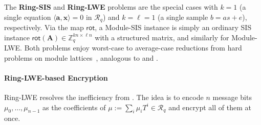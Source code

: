 \documentclass[../../book.tex]{subfiles}
\begin{document}
The \textbf{Ring-SIS} and \textbf{Ring-LWE} problems are the special cases with $k = 1$ (a single equation $\langle \mathbf{a},\mathbf{x} \rangle = 0$ in $\mathcal{R}_q$) and $k = \ell = 1$ (a single sample $b = as+e$), respectively.
Via the map $\mathsf{rot}$, a Module-SIS instance is simply an ordinary SIS instance $\mathsf{rot}(\mathbf{A}) \in \mathbb{Z}_q^{kn \times \ell n}$ with a structured matrix, and similarly for Module-LWE.
Both problems enjoy worst-case to average-case reductions from hard problems on module lattices~\cite{EPRINT:LyuPeiReg12,DCC:AdeDam15}, analogous to  and .

\paragraph{Ring-LWE-based Encryption}
Ring-LWE resolves the inefficiency from .
The idea is to encode $n$ message bits $\mu_0,\dots,\mu_{n-1}$ as the coefficients of $\mu := \sum_i \mu_iT^i \in \mathcal{R}_q$ and encrypt all of them at once.
\end{document}
